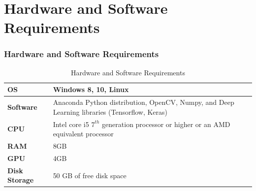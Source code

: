 \documentclass{beamer}
\begin{document}
\section{Hardware and Software Requirements}
\begin{frame}
	\frametitle{Hardware and Software Requirements}
	\begin{table}
		\centering
		\begin{tabular}[!h]{|p{3cm}|p{7cm}|}
			\hline
			\textbf{OS} & Windows 8, 10, Linux \\
			\hline
			\textbf{Software} & Anaconda Python distribution, OpenCV, Numpy, and Deep Learning libraries (Tensorflow, Keras) \\
			\hline
			\textbf{CPU} & Intel core i5 $7^{th}$ generation processor or higher or an AMD equivalent processor \\
			\hline
			\textbf{RAM} & 8GB \\
			\hline
			\textbf{GPU} & 4GB \\
			\hline
			\textbf{Disk Storage} & 50 GB of free disk space \\
			\hline
		\end{tabular}
		\caption{Hardware and Software Requirements}
		\label{requirements}
	\end{table}
\end{frame}















\end{document}
